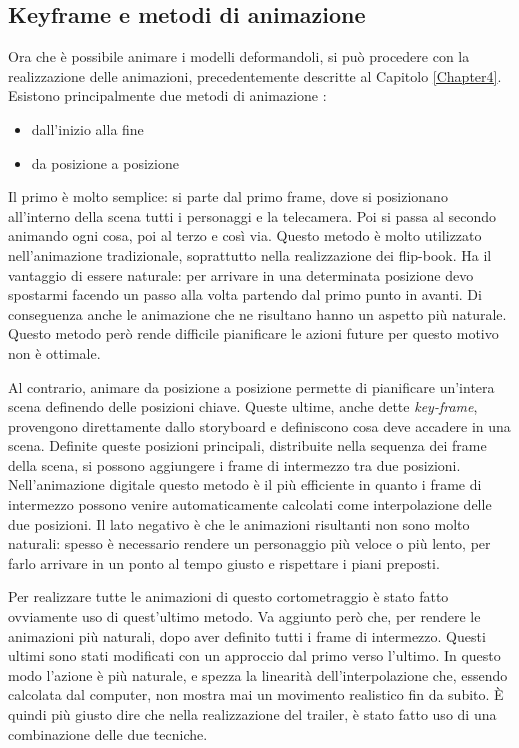 \subsection{Keyframe e metodi di animazione}
Ora che è possibile animare i modelli deformandoli, si può procedere con la realizzazione delle animazioni, precedentemente descritte al Capitolo \ref{Chapter4}.
Esistono principalmente due metodi di animazione \cite{Williams:2009:ASK:1823185}:
\begin{itemize}
    \item dall'inizio alla fine
    \item da posizione a posizione
\end{itemize}
Il primo è molto semplice: si parte dal primo frame, dove si posizionano all'interno della scena tutti i personaggi e la telecamera. Poi si passa al secondo animando ogni cosa, poi al terzo e così via. 
Questo metodo è molto utilizzato nell'animazione tradizionale, soprattutto nella realizzazione dei flip-book.
Ha il vantaggio di essere naturale: per arrivare in una determinata posizione devo spostarmi facendo un passo alla volta partendo dal primo punto in avanti.
Di conseguenza anche le animazione che ne risultano hanno un aspetto più naturale.
Questo metodo però rende difficile pianificare le azioni future per questo motivo non è ottimale.

Al contrario, animare da posizione a posizione permette di pianificare un'intera scena definendo delle posizioni chiave.
Queste ultime, anche dette \emph{key-frame}, provengono direttamente dallo storyboard e definiscono cosa deve accadere in una scena.
Definite queste posizioni principali, distribuite nella sequenza dei frame della scena, si possono aggiungere i frame di intermezzo tra due posizioni.
Nell'animazione digitale questo metodo è il più efficiente in quanto i frame di intermezzo possono venire automaticamente calcolati come interpolazione delle due posizioni.
Il lato negativo è che le animazioni risultanti non sono molto naturali: spesso è necessario rendere un personaggio più veloce o più lento, per farlo arrivare in un ponto al tempo giusto e rispettare i piani preposti.

Per realizzare tutte le animazioni di questo cortometraggio è stato fatto ovviamente uso di quest'ultimo metodo.
Va aggiunto però che, per rendere le animazioni più naturali, dopo aver definito tutti i frame di intermezzo.
Questi ultimi sono stati modificati con un approccio dal primo verso l'ultimo.
In questo modo l'azione è più naturale, e spezza la linearità dell'interpolazione che, essendo calcolata dal computer, non mostra mai un movimento realistico fin da subito.
È quindi più giusto dire che nella realizzazione del trailer, è stato fatto uso di una combinazione delle due tecniche.

